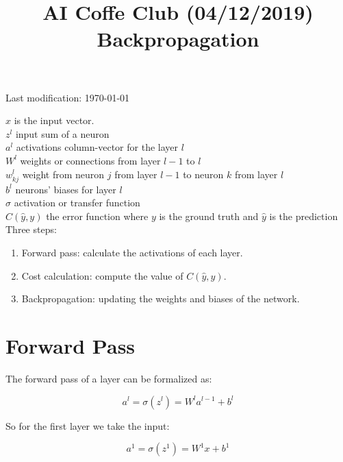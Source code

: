 \documentclass{article}
\begin{document}
\title{AI Coffe Club (04/12/2019)\\ Backpropagation}
\date{}

\maketitle

\begin{center}
Last modification: \today\\
\end{center}

\noindent $x$ is the input vector.\\
$z^l$ input sum of a neuron\\
$a^l$ activations column-vector for the layer $l$\\
$W^l$ weights or connections from layer $l-1$ to $l$\\
$w_{kj}^l$ weight from neuron $j$ from layer $l-1$ to neuron $k$ from layer $l$\\
$b^l$ neurons' biases for layer $l$\\
$\sigma$ activation or transfer function\\
$C(\hat{y}, y)$ the error function where $y$ is the ground truth and $\hat{y}$ is the prediction\\

Three steps:
\begin{enumerate}
  \item Forward pass: calculate the activations of each layer.
  \item Cost calculation: compute the value of $C(\hat{y}, y)$.
  \item Backpropagation: updating the weights and biases of the network.
\end{enumerate}

\section{Forward Pass}

The forward pass of a layer can be formalized as:

\begin{equation}
a^l = \sigma(z^l) = W^l a^{l-1} + b^l
\end{equation}

So for the first layer we take the input:

\begin{equation}
a^1 = \sigma(z^1) = W^1 x + b^1
\end{equation}
\end{document}
